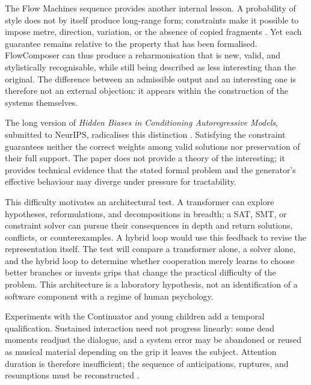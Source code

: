 \documentclass[11pt,a4paper]{article}
\begin{document}
The Flow Machines sequence provides another internal lesson. A probability of style
does not by itself produce long-range form; constraints make it possible to impose
metre, direction, variation, or the absence of copied fragments
\parencite{pachet2011markov,barbieri2012lyrics,papadopoulos2014avoiding,
papadopoulos2016nonplagiaristic,papadopoulos2016flowcomposer,
pachet2017variations}. Yet each guarantee remains relative to the property that has
been formalised. FlowComposer can thus produce a reharmonisation that is new, valid,
and stylistically recognisable, while still being described as less interesting than
the original. The difference between an admissible output and an interesting one is
therefore not an external objection: it appears within the construction of the systems
themselves.

The long version of \emph{Hidden Biases in Conditioning Autoregressive Models},
submitted to NeurIPS, radicalises this distinction
\parencite{pachet2026biases}. Satisfying the constraint guarantees neither the
correct weights among valid solutions nor preservation of their full support.
The paper does not provide a theory of the interesting; it provides technical
evidence that the stated formal problem and the generator's effective behaviour
may diverge under pressure for tractability.

This difficulty motivates an architectural test. A transformer can explore
hypotheses, reformulations, and decompositions in breadth; a SAT, SMT, or
constraint solver can pursue their consequences in depth and return solutions,
conflicts, or counterexamples. A hybrid loop would use this feedback to revise
the representation itself. The test will compare a transformer alone, a solver
alone, and the hybrid loop to determine whether cooperation merely learns to
choose better branches or invents grips that change the practical difficulty of
the problem. This architecture is a laboratory hypothesis, not an
identification of a software component with a regime of human psychology.

Experiments with the Continuator and young children add a temporal qualification.
Sustained interaction need not progress linearly: some dead moments readjust the
dialogue, and a system error may be abandoned or reused as musical material depending
on the grip it leaves the subject. Attention duration is therefore insufficient; the
sequence of anticipations, ruptures, and resumptions must be reconstructed
\parencite{addessi2005experiments,addessi2006flowmachine}.
\end{document}
